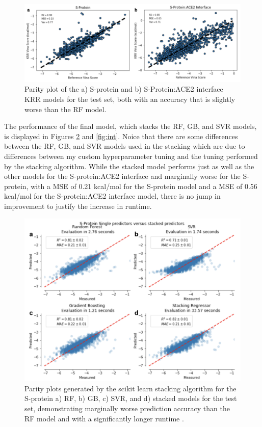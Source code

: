 \documentclass[11pt]{article}
\begin{document}
   \begin{figure}
     \centering
     \includegraphics[width=160mm]{krr}
     \caption{Parity plot of the a) S-protein and b) S-Protein:ACE2 interface KRR models for the test set, both with an accuracy that is slightly worse than the RF model.}
     \label{fig:krr}
   \end{figure} 
   
   The performance of the final model, which stacks the RF, GB, and SVR models, is displayed in Figures \ref{fig:iso} and \ref{fig:int}. Noice that there are some differences between the RF, GB, and SVR models used in the stacking which are due to differences between my custom hyperparameter tuning and the tuning performed by the stacking algorithm. While the stacked model performs just as well as the other models for the S-protein:ACE2 interface and marginally worse for the S-protein, with a MSE of 0.21 kcal/mol for the S-protein model and a MSE of 0.56 kcal/mol for the S-protein:ACE2 interface model, there is no jump in improvement to justify the increase in runtime.
  
   \begin{figure}
     \centering
     \includegraphics[width=120mm]{isoStacked}
     \caption{Parity plots generated by the scikit learn stacking algorithm for the S-protein a) RF, b) GB, c) SVR, and d) stacked models for the test set, demonstrating marginally worse prediction accuracy than the RF model and with a significantly longer runtime \cite{scikit}.}
     \label{fig:iso}
   \end{figure} 
   
\end{document}
